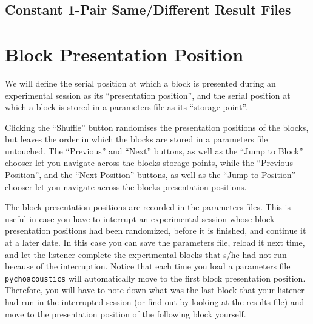 \subsection{Constant 1-Pair Same/Different Result Files}
\section{Block Presentation Position}
\label{sec:shuffling}

We will define the serial position at which a block is presented
during an experimental session as its ``presentation position'', and the serial
position at which a block is stored in a parameters file as its ``storage point''.

Clicking the ``Shuffle'' button randomises the presentation positions of the blocks, but leaves
the order in which the blocks are stored in a parameters file untouched. The ``Previous'' and ``Next'' buttons,
as well as the ``Jump to Block'' chooser let you navigate across the blocks storage points, while the 
``Previous Position'', and the ``Next Position'' buttons,
as well as the ``Jump to Position'' chooser let you navigate across the blocks presentation
positions. 

The block presentation positions are recorded in the parameters files. This is useful in case you have 
to interrupt an experimental session whose block presentation positions had been randomized, before it is finished, and continue it at a later date.
In this case you can save the parameters file, reload it next time, and let the listener complete the experimental blocks
that s/he had not run because of the interruption. Notice that each time you load a parameters file \texttt{pychoacoustics} will automatically
move to the first block presentation position. Therefore, you will have to note down what was the last block that your listener had run in the interrupted 
session (or find out by looking at the results file) and move to the presentation position of the following block yourself.

